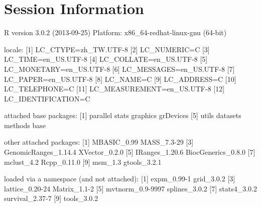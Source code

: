 \documentclass[a4paper,10pt]{article}
\begin{document}
\section{Session Information}

\begin{Schunk}
\begin{Soutput}
R version 3.0.2 (2013-09-25)
Platform: x86_64-redhat-linux-gnu (64-bit)

locale:
 [1] LC_CTYPE=zh_TW.UTF-8      
 [2] LC_NUMERIC=C              
 [3] LC_TIME=en_US.UTF-8       
 [4] LC_COLLATE=en_US.UTF-8    
 [5] LC_MONETARY=en_US.UTF-8   
 [6] LC_MESSAGES=en_US.UTF-8   
 [7] LC_PAPER=en_US.UTF-8      
 [8] LC_NAME=C                 
 [9] LC_ADDRESS=C              
[10] LC_TELEPHONE=C            
[11] LC_MEASUREMENT=en_US.UTF-8
[12] LC_IDENTIFICATION=C       

attached base packages:
[1] parallel  stats     graphics  grDevices
[5] utils     datasets  methods   base     

other attached packages:
 [1] MBASIC_0.99          MASS_7.3-29         
 [3] GenomicRanges_1.14.4 XVector_0.2.0       
 [5] IRanges_1.20.6       BiocGenerics_0.8.0  
 [7] mclust_4.2           Rcpp_0.11.0         
 [9] msm_1.3              gtools_3.2.1        

loaded via a namespace (and not attached):
[1] expm_0.99-1      grid_3.0.2      
[3] lattice_0.20-24  Matrix_1.1-2    
[5] mvtnorm_0.9-9997 splines_3.0.2   
[7] stats4_3.0.2     survival_2.37-7 
[9] tools_3.0.2     
\end{Soutput}
\end{Schunk}



%


\end{document}
